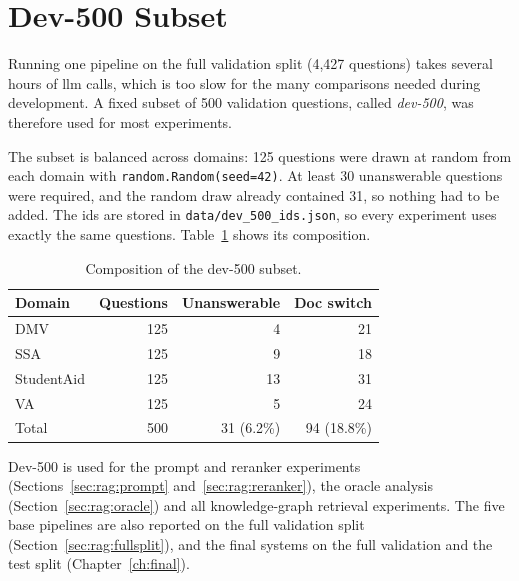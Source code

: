\section{Dev-500 Subset}\label{sec:dataset:dev500}

Running one pipeline on the full validation split (4{,}427 questions) takes several hours
of \gls{llm} calls, which is too slow for the many comparisons needed during development.
A fixed subset of 500 validation questions, called \emph{dev-500}, was therefore used for
most experiments.

The subset is balanced across domains: 125 questions were drawn at random from each
domain with \texttt{random.Random(seed=42)}. At least 30 unanswerable questions were
required, and the random draw already contained 31, so nothing had to be added. The ids
are stored in \texttt{data/dev\_500\_ids.json}, so every experiment uses exactly the same
questions. Table~\ref{tab:dataset:dev500} shows its composition.

\begin{table}[ht]
    \centering
    \caption{Composition of the dev-500 subset.}
    \label{tab:dataset:dev500}
    \begin{tabular}{lrrr}
        \toprule
        Domain & Questions & Unanswerable & Doc switch \\
        \midrule
        DMV          & 125 &  4 & 21 \\
        SSA          & 125 &  9 & 18 \\
        StudentAid   & 125 & 13 & 31 \\
        VA           & 125 &  5 & 24 \\
        \midrule
        Total        & 500 & 31 (6.2\%) & 94 (18.8\%) \\
        \bottomrule
    \end{tabular}
\end{table}

Dev-500 is used for the prompt and reranker experiments
(Sections~\ref{sec:rag:prompt} and~\ref{sec:rag:reranker}), the oracle analysis
(Section~\ref{sec:rag:oracle}) and all knowledge-graph retrieval experiments. The five
base pipelines are also reported on the full validation split
(Section~\ref{sec:rag:fullsplit}), and the final systems on the full validation and the
test split (Chapter~\ref{ch:final}).
